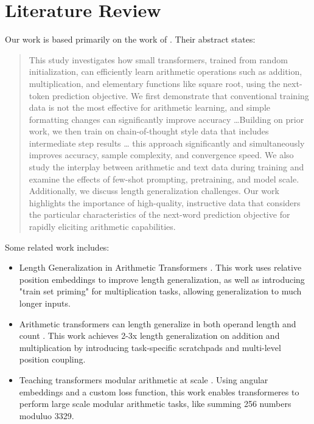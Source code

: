 \documentclass[12pt]{article}
\begin{document}
\section{Literature Review}
Our work is based primarily on the work of \cite{lee2023teaching}.
Their abstract states:
\begin{quote}
    This study investigates how small transformers, trained
    from random initialization, can efficiently learn arithmetic operations such as
    addition, multiplication, and elementary functions like square root, using the next-
    token prediction objective. We first demonstrate that conventional training data
    is not the most effective for arithmetic learning, and simple formatting changes
    can significantly improve accuracy \dots Building on prior work, we then train
    on chain-of-thought style data that includes intermediate step results \dots
    this approach significantly and simultaneously
    improves accuracy, sample complexity, and convergence speed. We also study
    the interplay between arithmetic and text data during training and examine the
    effects of few-shot prompting, pretraining, and model scale. Additionally, we
    discuss length generalization challenges. Our work highlights the importance of
    high-quality, instructive data that considers the particular characteristics of the
    next-word prediction objective for rapidly eliciting arithmetic capabilities.
\end{quote}
Some related work includes:
\begin{itemize}
    \item Length Generalization in Arithmetic Transformers \cite{jelassi2023length}. This work uses relative position embeddings to improve length generalization, as well as introducing "train set priming" for multiplication tasks, allowing generalization to much longer inputs.
    \item Arithmetic transformers can length generalize in both operand length and count \cite{cho2024arithmetic}. This work achieves 2-3x length generalization on addition and multiplication by introducing task-specific scratchpads and multi-level position coupling.
    \item Teaching transformers modular arithmetic at scale \cite{saxena2024teaching}. Using angular embeddings and a custom loss function, this work enables transformeres to perform large scale modular arithmetic tasks, like summing 256 numbers moduluo 3329.
\end{itemize}
\end{document}
